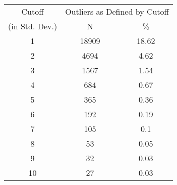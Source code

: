 \begin{tabular}{ccc}
  \toprule
  \multicolumn{1}{c}{Cutoff} & \multicolumn{2}{c}{Outliers as Defined by Cutoff} \\ (in Std. Dev.) & N & \% \\ \midrule
1 & 18909 & 18.62 \\ 
  2 & 4694 & 4.62 \\ 
  3 & 1567 & 1.54 \\ 
  4 & 684 & 0.67 \\ 
  5 & 365 & 0.36 \\ 
  6 & 192 & 0.19 \\ 
  7 & 105 & 0.1 \\ 
  8 & 53 & 0.05 \\ 
  9 & 32 & 0.03 \\ 
  10 & 27 & 0.03 \\ 
   \bottomrule
\end{tabular}
